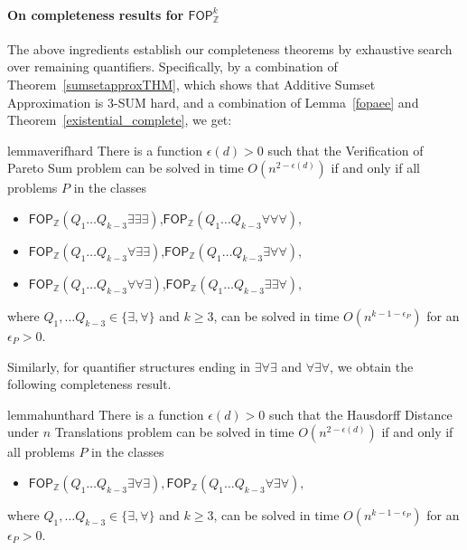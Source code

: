 \paragraph*{On completeness results for $\mathsf{FOP}_{\mathbb{Z}}^k$}
The above ingredients establish our completeness theorems by exhaustive search over remaining quantifiers. Specifically, by a combination of Theorem~\ref{sumsetapproxTHM}, which shows that Additive Sumset Approximation is $3$-SUM hard, and a combination of Lemma~\ref{fopaee} and Theorem~\ref{existential_complete},
we get:
\begin{restatable}[]{lemma}{verifhard}
There is a function $\epsilon(d)>0$ such that 
the Verification of Pareto Sum problem can be solved in time $O(n^{2-\epsilon(d)})$
if and only if all problems $P$ in the classes 
\begin{itemize}
\item $\mathsf{FOP}_{\mathbb{Z}}(Q_1\dots Q_{k-3}\exists \exists \exists)$,$\mathsf{FOP}_{\mathbb{Z}}(Q_1\dots Q_{k-3}\forall \forall \forall),$
\item $\mathsf{FOP}_{\mathbb{Z}}(Q_1\dots Q_{k-3}\forall \exists \exists)$,$\mathsf{FOP}_{\mathbb{Z}}(Q_1\dots Q_{k-3}\exists \forall \forall),$
\item $\mathsf{FOP}_{\mathbb{Z}}(Q_1\dots Q_{k-3}\forall \forall \exists)$,$\mathsf{FOP}_{\mathbb{Z}}(Q_1\dots Q_{k-3}\exists \exists \forall),$
\end{itemize}
where $Q_1, \dots Q_{k-3} \in \{ \exists, \forall \}$ and $k\geq 3$,
can be solved in time $O(n^{k-1-\epsilon_P})$ for an $\epsilon_P>0$.
\label{verif-complete-three}
\end{restatable}

Similarly, for quantifier structures ending in $\exists \forall \exists$ and $\forall \exists \forall$, we obtain the following completeness result.

\begin{restatable}[]{lemma}{hunthard}
	There is a function $\epsilon(d)>0$ such that 
	the Hausdorff Distance under $n$ Translations problem can be solved in time $O(n^{2-\epsilon(d)})$
	if and only if all problems $P$ in the classes
	\begin{itemize}
    \item $\mathsf{FOP}_{\mathbb{Z}}(Q_1\dots Q_{k-3}\exists \forall \exists), \mathsf{FOP}_{\mathbb{Z}}(Q_1\dots Q_{k-3}\forall \exists \forall),$
	\end{itemize}
	where $Q_1, \dots Q_{k-3} \in \{ \exists, \forall \}$ and $k\geq 3$,
	can be solved in time $O(n^{k-1-\epsilon_P})$ for an $\epsilon_P>0$.
	\label{hunthard}
	\end{restatable}

